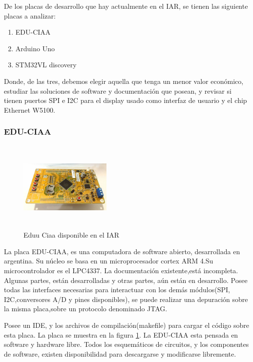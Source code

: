  De los placas de desarrollo que hay actualmente en el IAR, se tienen las siguiente placas a analizar: 
 
\begin{enumerate}
	\item EDU-CIAA
	\item Arduino Uno 
	\item STM32VL discovery 
\end{enumerate}
Donde, de las tres, debemos elegir aquella que tenga un menor valor económico, estudiar las soluciones de software y documentación que posean, y revisar si tienen puertos SPI e I2C para el display usado como interfaz de usuario y el chip Ethernet W5100.  

\subsubsection{EDU-CIAA}

\begin{figure}
	\includegraphics[width=0.4\textwidth , height=  45mm]{edu_ciaa}
	\caption{Eduu Ciaa disponible en el IAR}
	\label{fig:edu_ciaa}
\end{figure}
La placa EDU-CIAA, es una computadora de software abierto, desarrollada en argentina. Su núcleo se basa en un microprocesador cortex ARM 4.Su microcontrolador es el LPC4337. La documentación existente,está incompleta. Algunas partes, están desarrolladas y otras partes, aún están en desarrollo. Posee todas las interfaces necesarias para interactuar con los demás módulos(SPI, I2C,conversores A/D y pines disponibles), se puede realizar una depuración sobre la misma placa,sobre un protocolo denominado JTAG. 


Posee un IDE, y los archivos de compilación(makefile) para cargar el código sobre esta placa. La placa se muestra en la figura \ref{fig:edu_ciaa}. La EDU-CIAA esta pensada en software y hardware libre. Todos los esquemáticos de circuitos, y los componentes de software, existen disponibilidad para descargarse y modificarse libremente. 

